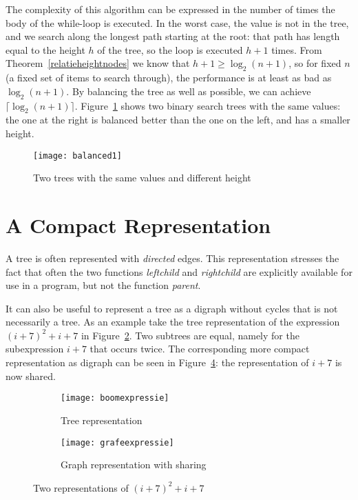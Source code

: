 The complexity of this algorithm can be expressed in the number of
times the body of the while-loop is executed. In the worst case,
the value is not in the tree, and we search along the longest path
starting at the root: that path has length equal to the height $h$ of
the tree, so the loop is executed $h+1$ times. From
Theorem~\ref{relatieheightnodes} we know that $h+1 \geq \log_2(n+1)$, so
for fixed $n$ (a fixed set of items to search through), the performance is at least as bad as $\log_2(n+1)$. By balancing
the tree as well as possible, we can achieve $\lceil \log_2(n+1)
\rceil$. Figure~\ref{balanced1} shows two binary search trees with the
same values: the one at the right is balanced better than the one on
the left, and has a smaller height.

\begin{figure}[ht]
	\centering
	\texttt{[image: balanced1]}
	\caption{Two trees with the same values and different height \label{balanced1}}
\end{figure}


\section{A Compact Representation}

A tree is often represented with {\em directed} edges. This
representation stresses the fact that often the two functions {\em
leftchild} and {\em rightchild} are explicitly available for use in a
program, but not the function {\em parent}.

It can also be useful to represent a tree as a digraph without cycles
that is not necessarily a tree. As an example take the tree
representation of the expression $(i+7)^{2} + i + 7$ in
Figure~\ref{boomexpressie}. Two subtrees are equal, namely for the
subexpression $i+7$ that occurs twice. The corresponding more compact
representation as digraph can be seen in Figure~\ref{graafexpressie}:
the representation of $i+7$ is now shared.

\begin{figure}[ht]
	\centering
	\begin{subfigure}{0.4\linewidth}
		\centering
		\texttt{[image: boomexpressie]}
		\caption{Tree representation}
		\label{boomexpressie}
	\end{subfigure}\qquad\qquad
	\begin{subfigure}{0.3\linewidth}
		\centering
		\texttt{[image: grafeexpressie]}
		\caption{Graph representation with sharing}
		\label{graafexpressie}
	\end{subfigure}
	\caption{Two representations of $(i+7)^{2} + i + 7$}
\end{figure}

